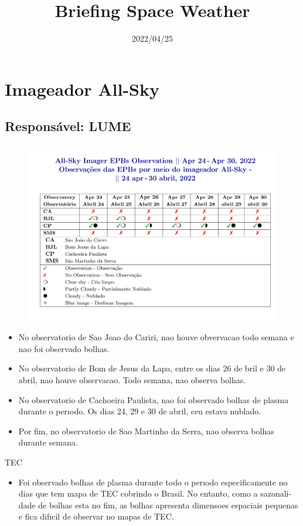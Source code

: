 \documentclass[11pt, oneside]{article}
\title{Briefing Space Weather}
\date{2022/04/25}
\begin{document}
\maketitle 

 \section{Imageador All-Sky} 
 \subsection{Responsável: LUME} 
 
\begin{figure}[H]
    
                        \centering
   
                             \includegraphics[width=14cm]{./figures//figureImager_0.png}

                        \end{figure}

                     \begin{itemize} 
 \item  No observatorio de Sao Joao do Cariri, nao houve obvervacao todo semana e nao foi observado bolhas. 
\item  No observatorio de Bom de Jesus da Lapa, entre os dias 26 de bril e 30 de abril, nao houve observacao. Todo semana, nao observa bolhas. 
\item  No observatorio de Cachoeira Paulista, nao foi observado bolhas de plasma durante o perıodo. Os dias 24, 29 e 30 de abril, ceu estava nublado. 
\item  Por fim, no observatorio de Sao Martinho da Serra, nao observa bolhas durante semana. 
\end{itemize} 
 TEC 
\begin{itemize} 
 \item  Foi observado bolhas de plasma durante todo o perıodo especificamente no dias que tem mapa de TEC cobrindo o Brasil. No entanto, como a sazonali- dade de bolhas esta no fim, as bolhas apresenta dimensoes espaciais pequenas e fica difıcil de observar no mapas de TEC. 
\end{itemize} 
 
\end{document}
